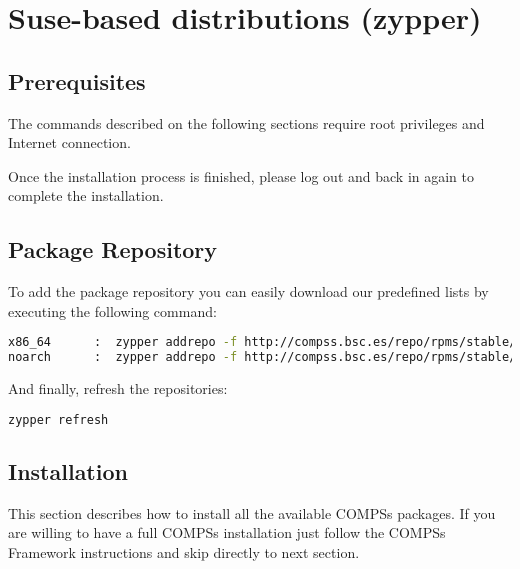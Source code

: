 \section{Suse-based distributions (zypper)}
\label{sec:Suse_zypper}


\subsection{Prerequisites}
The commands described on the following sections require root privileges and Internet connection.

Once the installation process is finished, please log out and back in again to complete the installation. 

\subsection{Package Repository}
To add the package repository you can easily download our predefined lists by executing the following command:
\begin{lstlisting}[language=bash]
x86_64      :  zypper addrepo -f http://compss.bsc.es/repo/rpms/stable/suse/x86_64 compss
noarch      :  zypper addrepo -f http://compss.bsc.es/repo/rpms/stable/suse/noarch compss
\end{lstlisting}

And finally, refresh the repositories:
\begin{lstlisting}[language=bash]
zypper refresh
\end{lstlisting}

\subsection{Installation}
This section describes how to install all the available COMPSs packages. If you are willing to have a full COMPSs installation 
just follow the COMPSs Framework instructions and skip directly to next section.

